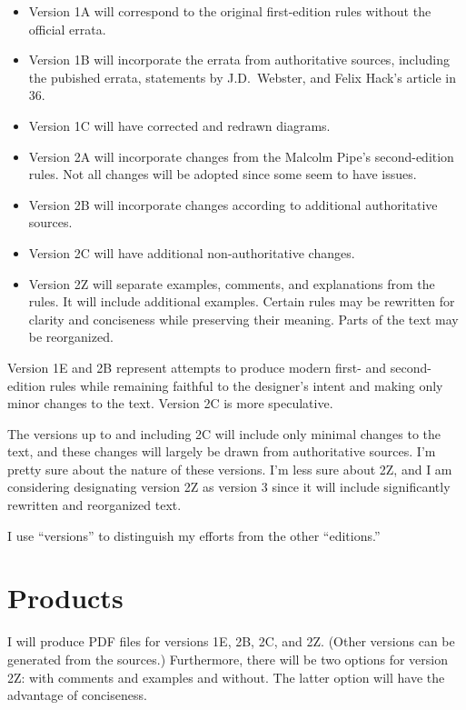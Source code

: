 \documentclass[10pt]{article}
\begin{document}
\begin{itemize}
    \item Version 1A will correspond to the original first-edition rules without the official errata.
    \item Version 1B will incorporate the errata from authoritative sources, including the pubished errata, statements by J.D.\ Webster, and Felix Hack’s article in {\APJ} 36.
    \item Version 1C will have corrected and redrawn diagrams.
    \item Version 2A will incorporate changes from the Malcolm Pipe’s second-edition rules. Not all changes will be adopted since some seem to have issues.
    \item Version 2B will incorporate changes according to additional authoritative sources.
    \item Version 2C will have additional non-authoritative changes.
    \item Version 2Z will separate examples, comments, and explanations from the rules. It will include additional examples. Certain rules may be rewritten for clarity and conciseness while preserving their meaning. Parts of the text may be reorganized.
\end{itemize}

Version 1E and 2B represent attempts to produce modern first- and second-edition rules while remaining faithful to the designer’s intent and making only minor changes to the text. Version 2C is more speculative.

The versions up to and including 2C will include only minimal changes to the text, and these changes will largely be drawn from authoritative sources. I’m pretty sure about the nature of these versions. I’m less sure about 2Z, and I am considering designating version 2Z as version 3 since it will include significantly rewritten and reorganized text.

I use “versions” to distinguish my efforts from the other “editions.”

\section*{Products}

I will produce PDF files for versions 1E, 2B, 2C, and 2Z. (Other versions can be generated from the sources.) Furthermore, there will be two options for version 2Z: with comments and examples and without. The latter option will have the advantage of conciseness. 
\end{document}
